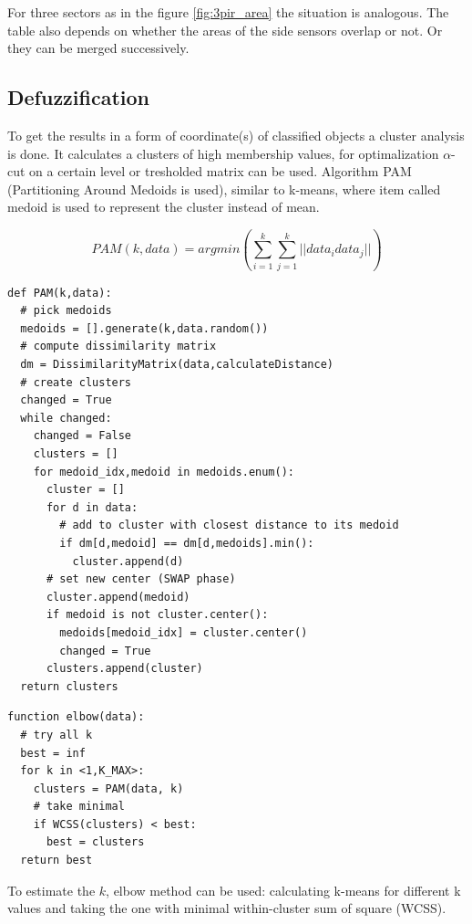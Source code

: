 For three sectors as in the figure \ref{fig:3pir_area} the situation is analogous. The table also depends
on whether the areas of the side sensors overlap or not. Or they can be merged successively.

\subsection*{Defuzzification}

To get the results in a form of coordinate(s) of classified objects a cluster analysis is done. It calculates
a clusters of high membership values, for optimalization $\alpha$-cut on a certain level or tresholded
matrix can be used. Algorithm PAM (Partitioning Around Medoids is used), similar to k-means, where item called
medoid is used to represent the cluster instead of mean.

\begin{equation}
\mathit{PAM}(k, data) = argmin \left( \sum_{i=1}^{k} \sum_{j=1}^{k} ||data_{i} data_{j}||  \right)
\end{equation}

\begin{lstlisting}[style=python]
def PAM(k,data):
  # pick medoids
  medoids = [].generate(k,data.random())
  # compute dissimilarity matrix
  dm = DissimilarityMatrix(data,calculateDistance)
  # create clusters
  changed = True
  while changed:
    changed = False
    clusters = []
    for medoid_idx,medoid in medoids.enum():
      cluster = []
      for d in data:
        # add to cluster with closest distance to its medoid
        if dm[d,medoid] == dm[d,medoids].min():
          cluster.append(d)
      # set new center (SWAP phase)
      cluster.append(medoid)
      if medoid is not cluster.center():
        medoids[medoid_idx] = cluster.center()
        changed = True
      clusters.append(cluster)
  return clusters
\end{lstlisting}

\begin{lstlisting}[style=python]
function elbow(data):
  # try all k
  best = inf
  for k in <1,K_MAX>:
    clusters = PAM(data, k)
    # take minimal
    if WCSS(clusters) < best:
      best = clusters
  return best
\end{lstlisting}

To estimate the $k$, elbow method can be used: calculating k-means for different k values and taking the one with
minimal within-cluster sum of square (WCSS).\cite{ClusterAnalysis} \cite{VagueNatureInformation}

